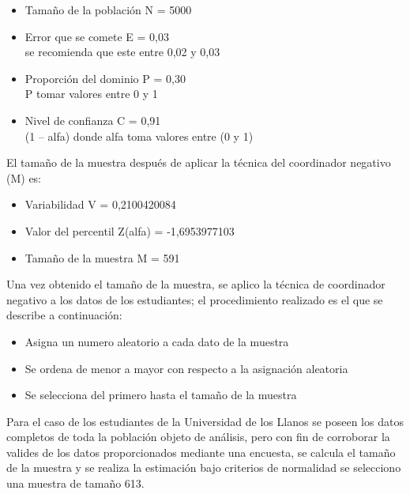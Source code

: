 \begin{itemize}
	\begin{itemize}
		\item Tamaño de la población 	N = 5000	
		\item Error que se comete		E = 0,03	\\se recomienda que este entre 0,02 y 0,03
		\item Proporción del dominio	P = 0,30	\\P tomar valores entre 0 y 1
		\item Nivel de confianza		C = 0,91	\\(1 – alfa) donde alfa toma valores entre (0 y 1)
	\end{itemize}
	\bigskip
  	  	El tamaño de la muestra después de aplicar la técnica del coordinador negativo (M) es:
  	\bigskip  	
  	\begin{itemize}
  		\item Variabilidad			V = 0,2100420084
	  	\item Valor del percentil 	Z(alfa) = -1,6953977103
		\item Tamaño de la muestra 	M = 591  	
  	\end{itemize}
  	\bigskip  	
  	Una vez obtenido el tamaño de la muestra, se aplico la técnica de coordinador negativo a los datos de los estudiantes; el procedimiento realizado es el que se describe a continuación:
  	\bigskip
  	\begin{itemize}
  		\item Asigna un numero aleatorio a cada dato de la muestra
		\item Se ordena de menor a mayor con respecto a la asignación aleatoria 
		\item Se selecciona del primero hasta el tamaño de la muestra  
  	 \end{itemize}
  	\bigskip  		
  	Para el caso de los estudiantes de la Universidad de los Llanos se poseen los datos completos de toda la población objeto de análisis, pero con fin de corroborar la valides de los datos proporcionados mediante una encuesta, se calcula el tamaño de la muestra y se realiza la estimación bajo criterios de normalidad se selecciono una muestra de tamaño 613.
  	  	
   
		 

\end{itemize}
